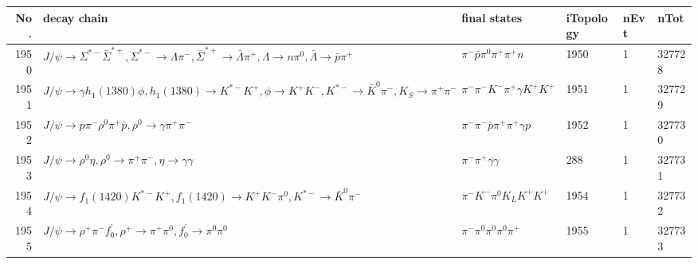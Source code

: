 \begin{table}[htbp] 
\begin{center}
\begin{small}
\begin{tabular}{rlllll}\hline\hline
 No. & decay chain & final states &  iTopology & nEvt & nTot \\\hline
1950&$J/\psi       \rightarrow \Sigma^{*-}       \bar{\Sigma}^{*+}, \Sigma^{*-}        \rightarrow \Lambda           \pi^{-}        , \bar{\Sigma}^{*+} \rightarrow \bar{\Lambda}    \pi^{+}        , \Lambda            \rightarrow n                 \pi^{0}        , \bar{\Lambda}     \rightarrow \bar{p}          \pi^{+}        $&$\pi^{-}        \bar{p}          \pi^{0}        \pi^{+}        \pi^{+}        n                 $& 1950&    1&327728\\
1951&$J/\psi       \rightarrow \gamma       h_{1}(1380)    \phi           , h_{1}(1380)     \rightarrow K^{*-}         K^{+}          , \phi            \rightarrow K^{+}          K^{-}          , K^{*-}          \rightarrow \bar{K}^{0}   \pi^{-}        , K_{S}           \rightarrow \pi^{+}        \pi^{-}        $&$\pi^{-}        \pi^{-}        K^{-}          \pi^{+}        \gamma       K^{+}          K^{+}          $& 1951&    1&327729\\
1952&$J/\psi       \rightarrow p                 \pi^{-}        \rho^{0}      \pi^{+}        \bar{p}          , \rho^{0}       \rightarrow \gamma       \pi^{+}        \pi^{-}        $&$\pi^{-}        \pi^{-}        \bar{p}          \pi^{+}        \pi^{+}        \gamma       p                 $& 1952&    1&327730\\
1953&$J/\psi       \rightarrow \rho^{0}      \eta          , \rho^{0}       \rightarrow \pi^{+}        \pi^{-}        , \eta           \rightarrow \gamma       \gamma       $&$\pi^{-}        \pi^{+}        \gamma       \gamma       $&  288&    1&327731\\
1954&$J/\psi       \rightarrow f_{1}(1420)    K^{*-}         K^{+}          , f_{1}(1420)     \rightarrow K^{+}          K^{-}          \pi^{0}        , K^{*-}          \rightarrow \bar{K}^{0}   \pi^{-}        $&$\pi^{-}        K^{-}          \pi^{0}        K_{L}          K^{+}          K^{+}          $& 1954&    1&327732\\
1955&$J/\psi       \rightarrow \rho^{+}      \pi^{-}        f^{'}_{0}     , \rho^{+}       \rightarrow \pi^{+}        \pi^{0}        , f^{'}_{0}      \rightarrow \pi^{0}        \pi^{0}        $&$\pi^{-}        \pi^{0}        \pi^{0}        \pi^{0}        \pi^{+}        $& 1955&    1&327733\\

\end{tabular}
\end{small}
\end{center}
\end{table}
